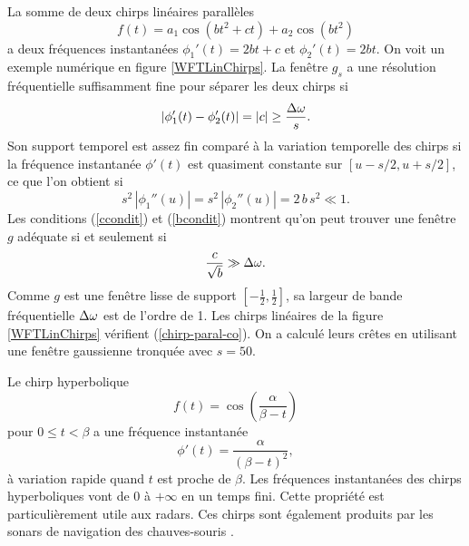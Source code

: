 \begin{Examples}
\item 
La somme de deux chirps lin\'{e}aires parall\`{e}les
\begin{equation}
\label{ParallLineCh}
f(t) = a_1 \cos (b t^2+ c t) + a_2 \cos (b t^2) 
\end{equation}
a deux fr\'{e}quences instantan\'{e}es 
$\phi_1'	(t)	= 2	bt +c$ et $\phi_2'	(t)	= 2	bt$.
On voit un exemple num\'{e}rique en figure \ref{WFTLinChirps}. La 
fen\^{e}tre $g_s$ a une r\'{e}solution fr\'{e}quentielle suffisamment 
fine pour s\'{e}parer les deux chirps si
\begin{equation}
\label{ccondit}
|\phi_1'(t) - \phi_2'(t) | = |c| \geq \frac {\Delta {\omega}} s .
\end{equation}
Son support temporel est assez fin compar\'{e} \`{a} la variation 
temporelle des chirps si la fr\'equence instantan\'ee
$\phi'(t)$ est quasiment constante sur $[u-s/2,u+s/2]$,
ce que l'on obtient si
\begin{equation}
\label{bcondit}
s^2 \,|\phi_1''(u)| = s^2 \,|\phi_2''(u)| = 
2 \,b\, s^2 \ll 1 .
\end{equation}
Les conditions (\ref{ccondit}) et (\ref{bcondit}) montrent qu'on peut 
trouver une fen\^{e}tre $g$ ad\'{e}quate si et seulement si 
\begin{equation}
\label{chirp-paral-co}
\frac {c} {\sqrt b} \gg \Delta {\omega} .
\end{equation}
Comme $g$ est une fen\^{e}tre lisse de support $[-\frac	1 2	, \frac	1 2	]$,
sa largeur de bande fr\'{e}quentielle $\Delta {\omega}$ est de l'ordre de 
1. Les chirps lin\'{e}aires de la figure \ref{WFTLinChirps} 
v\'{e}rifient (\ref{chirp-paral-co}). On a calcul\'{e} leurs 
cr\^{e}tes en utilisant une fen\^{e}tre gaussienne tronqu\'{e}e 
avec $s = 50$.

\item 
Le chirp hyperbolique
\[
f(t) = \cos \left(\frac \alpha {\beta -t}\right)
\]
pour $0 \leq t < \beta$ a une fr\'{e}quence instantan\'{e}e
\[
\phi'(t) = \frac \alpha {(\beta - t)^2},
\]
\`{a} variation rapide quand $t$ est proche de $\beta$. Les 
fr\'{e}quences instantan\'{e}es des chirps hyperboliques vont de $0$ 
\`{a} $+\infty$ en un temps fini. Cette propri\'{e}t\'{e} est 
particuli\`{e}rement utile aux radars. 
Ces chirps sont \'{e}galement 
produits par les sonars de navigation des chauves-souris 
\cite{torresani}.


\end{Examples}

